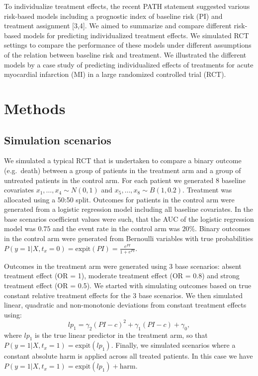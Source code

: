 \documentclass[]{elsarticle} %
\begin{document}
To individualize treatment effects, the recent PATH statement suggested
various risk-based models including a prognostic index of baseline risk
(PI) and treatment assignment {[}3,4{]}. We aimed to summarize and
compare different risk-based models for predicting individualized
treatment effects. We simulated RCT settings to compare the performance
of these models under different assumptions of the relation between
baseline risk and treatment. We illustrated the different models by a
case study of predicting individualized effects of treatments for acute
myocardial infarction (MI) in a large randomized controlled trial (RCT).

\hypertarget{methods}{%
\section{Methods}\label{methods}}

\hypertarget{simulation-scenarios}{%
\subsection{Simulation scenarios}\label{simulation-scenarios}}

We simulated a typical RCT that is undertaken to compare a binary
outcome (e.g.~death) between a group of patients in the treatment arm
and a group of untreated patients in the control arm. For each patient
we generated 8 baseline covariates \(x_1,\dots,x_4\sim N(0, 1)\) and
\(x_5,\dots,x_8\sim B(1, 0.2)\). Treatment was allocated using a 50:50
split. Outcomes for patients in the control arm were generated from a
logistic regression model including all baseline covariates. In the base
scenarios coefficient values were such, that the AUC of the logistic
regression model was \(0.75\) and the event rate in the control arm was
\(20\%\). Binary outcomes in the control arm were generated from
Bernoulli variables with true probabilities
\(P(y=1|X, t_x = 0) = \text{expit}(PI)=\frac{e^{PI}}{1+e^{PI}}\).

Outcomes in the treatment arm were generated using 3 base scenarios:
absent treatment effect (OR = 1), moderate treatment effect (OR = 0.8)
and strong treatment effect (OR = 0.5). We started with simulating
outcomes based on true constant relative treatment effects for the 3
base scenarios. We then simulated linear, quadratic and non-monotonic
deviations from constant treatment effects using:
\[lp_1 = \gamma_2(PI-c)^2 + \gamma_1(PI-c) + \gamma_0, \] where \(lp_1\)
is the true linear predictor in the treatment arm, so that
\(P(y=1|X, t_x=1) = \text{expit}(lp_1)\). Finally, we simulated
scenarios where a constant absolute harm is applied across all treated
patients. In this case we have
\(P(y=1|X,t_x=1) = \text{expit}(lp_1) + \text{harm}\).
\end{document}
